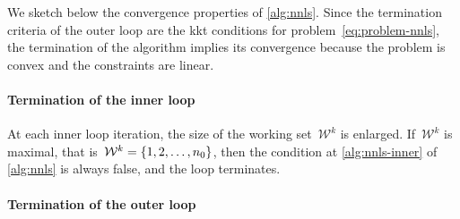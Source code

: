 We sketch below the convergence properties of \cref{alg:nnls}.
Since the termination criteria of the outer loop are the \gls{kkt} conditions for problem~\cref{eq:problem-nnls}, the termination of the algorithm implies its convergence because the problem is convex and the constraints are linear.



\paragraph{Termination of the inner loop}

At each inner loop iteration, the size of the working set~$\mathcal{W}^k$ is enlarged.
If~$\mathcal{W}^k$ is maximal, that is~$\mathcal{W}^k = \{1, 2, \dots, n_0\}$, then the condition at \cref{alg:nnls-inner} of \cref{alg:nnls} is always false, and the loop terminates.

\paragraph{Termination of the outer loop}

